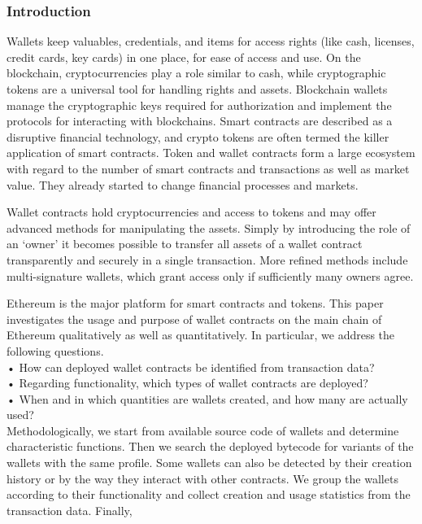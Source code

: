 \documentclass[12pt]{article}
\begin{document}
\subsubsection{Introduction}


\par Wallets keep valuables, credentials, and items for access
rights (like cash, licenses, credit cards, key cards) in one place,
for ease of access and use. On the blockchain, cryptocurrencies
play a role similar to cash, while cryptographic tokens are a
universal tool for handling rights and assets. Blockchain wallets manage the cryptographic keys required for authorization
and implement the protocols for interacting with blockchains.
Smart contracts are described as a disruptive financial
technology, and crypto tokens are often termed the killer
application of smart contracts. Token and wallet contracts form
a large ecosystem with regard to the number of smart contracts
and transactions as well as market value. They already started
to change financial processes and markets.\par
Wallet contracts hold cryptocurrencies and access to tokens
and may offer advanced methods for manipulating the assets.
Simply by introducing the role of an ‘owner’ it becomes
possible to transfer all assets of a wallet contract transparently
and securely in a single transaction. More refined methods
include multi-signature wallets, which grant access only if
sufficiently many owners agree.\par
Ethereum is the major platform for smart contracts and
tokens. This paper investigates the usage and purpose of wallet
contracts on the main chain of Ethereum qualitatively as
well as quantitatively. In particular, we address the following
questions.\\
• How can deployed wallet contracts be identified from
transaction data?\\
• Regarding functionality, which types of wallet contracts
are deployed?\\
• When and in which quantities are wallets created, and
how many are actually used?\\
Methodologically, we start from available source code of
wallets and determine characteristic functions. Then we search
the deployed bytecode for variants of the wallets with the same
profile. Some wallets can also be detected by their creation
history or by the way they interact with other contracts. We
group the wallets according to their functionality and collect
creation and usage statistics from the transaction data. Finally,
\end{document}
